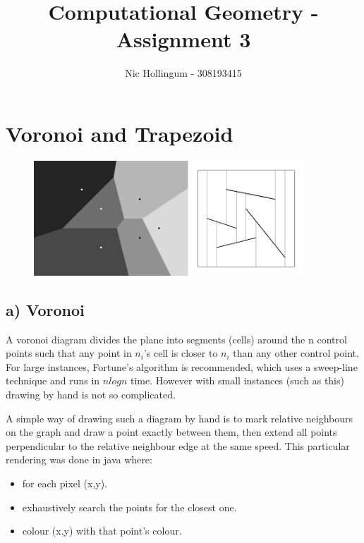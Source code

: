 \documentclass{article}
\author{Nic Hollingum - 308193415}
\title{Computational Geometry - Assignment 3}
\begin{document}
\maketitle

\section {Voronoi and Trapezoid}

\begin{figure}[htb]
\begin{center}
\leavevmode
\includegraphics[width=0.9\textwidth]{voronoi.png}
\end{center}
\label{fig:vortrap}
\end{figure}

\subsection{a) Voronoi}
A voronoi diagram divides the plane into segments (cells) around the n control points such that any point in $n_i$'s cell is closer to $n_i$ than any other control point.
For large instances, Fortune's algorithm is recommended, which uses a sweep-line technique and runs in $n log n$ time.
However with small instances (such as this) drawing by hand is not so complicated.

A simple way of drawing such a diagram by hand is to mark relative neighbours on the graph and draw a point exactly between them, then extend all points perpendicular to the relative neighbour edge at the same speed.
This particular rendering was done in java where:
\begin{itemize}
	\item for each pixel (x,y).
	\item exhaustively search the points for the closest one.
	\item colour (x,y) with that point's colour.
\end{itemize}
\end{document}
